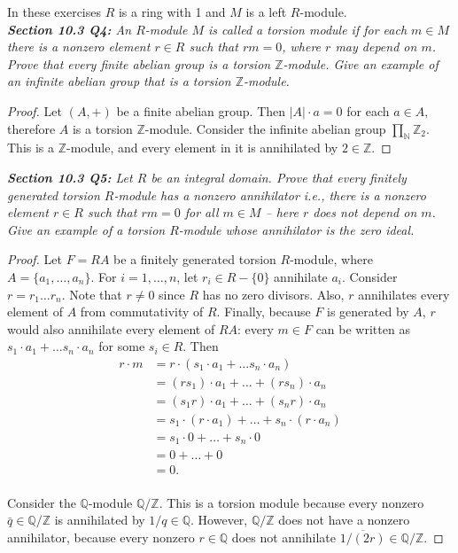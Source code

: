 \documentclass{article}
\begin{document}
In these exercises $R$ is a ring with 1 and $M$ is a left $R$-module. \\

\it \textbf{Section 10.3 Q4:} An $R$-module $M$ is called a torsion module
  if for each $m\in M$ there is a nonzero element $r\in R$ such that
  $rm=0$, where $r$ may depend on $m$. Prove that every finite abelian
  group is a torsion $\mathbb{Z}$-module. Give an example of an infinite
  abelian group that is a torsion $\mathbb{Z}$-module.

  \begin{proof}
    Let $(A,+)$ be a finite abelian group. Then $|A|\cdot a=0$ for each
    $a\in A$, therefore $A$ is a torsion $\mathbb{Z}$-module. Consider the
    infinite abelian group $\prod_{\mathbb{N}}\mathbb{Z}_2$. This is a
    $\mathbb{Z}$-module, and every element in it is annihilated by
    $2\in\mathbb{Z}$.
  \end{proof}

\it \textbf{Section 10.3 Q5:} Let $R$ be an integral domain. Prove that
  every finitely generated torsion $R$-module has a nonzero annihilator
  i.e., there is a nonzero element $r\in R$ such that $rm=0$ for all $m\in
  M$ -- here $r$ does not depend on $m$. Give an example of a torsion
  $R$-module whose annihilator is the zero ideal.

  \begin{proof}
    Let $F=RA$ be a finitely generated torsion $R$-module, where
    $A=\{a_1,\ldots,a_n\}$. For $i=1,\ldots,n$, let $r_i\in R-\{0\}$
    annihilate $a_i$. Consider $r=r_1\ldots r_n$. Note that $r\neq0$ since
    $R$ has no zero divisors. Also, $r$ annihilates every element of $A$
    from commutativity of $R$. Finally, because $F$ is generated by $A$,
    $r$ would also annihilate every element of $RA$: every $m\in F$ can be
    written as $s_1\cdot a_1+\ldots s_n\cdot a_n$ for some $s_i\in R$. Then
    \begin{align*}
      r\cdot m &=r\cdot(s_1\cdot a_1+\ldots s_n\cdot a_n)\\
      &=(rs_1)\cdot a_1 +\ldots +(rs_n)\cdot a_n\\
      &=(s_1r)\cdot a_1 +\ldots +(s_nr)\cdot a_n\\
      &=s_1\cdot(r\cdot a_1) +\ldots +s_n\cdot(r\cdot a_n)\\
      &=s_1\cdot0 +\ldots +s_n\cdot0\\
      &=0 +\ldots +0\\
      &=0.\\
    \end{align*}

    Consider the $\mathbb{Q}$-module $\mathbb{Q}/\mathbb{Z}$. This is a
    torsion module because every nonzero $\bar{q}\in\mathbb{Q}/\mathbb{Z}$
    is annihilated by $1/q\in\mathbb{Q}$. However, $\mathbb{Q}/\mathbb{Z}$
    does not have a nonzero annihilator, because every nonzero
    $r\in\mathbb{Q}$ does not annihilate
    $\overline{1/(2r)}\in\mathbb{Q}/\mathbb{Z}$.
  \end{proof}
\end{document}

